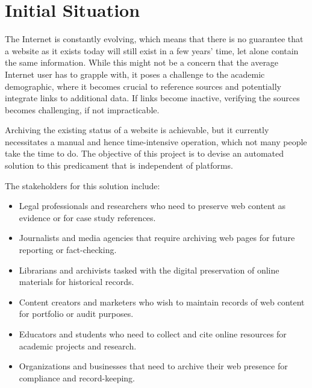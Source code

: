 \section{Initial Situation}
The Internet is constantly evolving, which means that there is no guarantee that a website as it exists today will still exist in a few years' time, let alone contain the same information. While this might not be a concern that the average Internet user has to grapple with, it poses a challenge to the academic demographic, where it becomes crucial to reference sources and potentially integrate links to additional data. If links become inactive, verifying the sources becomes challenging, if not impracticable.

Archiving the existing status of a website is achievable, but it currently necessitates a manual and hence time-intensive operation, which not many people take the time to do. The objective of this project is to devise an automated solution to this predicament that is independent of platforms.

The stakeholders for this solution include:
\begin{itemize}
	\item Legal professionals and researchers who need to preserve web content as evidence or for case study references.
	\item Journalists and media agencies that require archiving web pages for future reporting or fact-checking.
	\item Librarians and archivists tasked with the digital preservation of online materials for historical records.
	\item Content creators and marketers who wish to maintain records of web content for portfolio or audit purposes.
	\item Educators and students who need to collect and cite online resources for academic projects and research.
	\item Organizations and businesses that need to archive their web presence for compliance and record-keeping.
\end{itemize}


